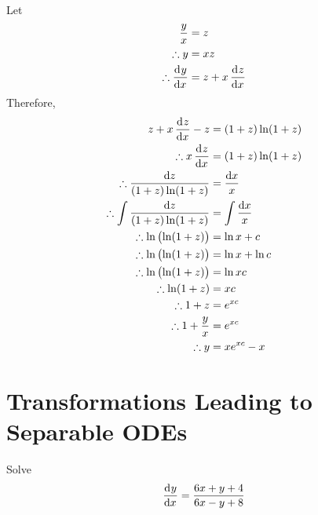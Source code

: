 \documentclass[fleqn, a4paper, 12pt, oneside]{amsart}
\theoremstyle{definition}
\theoremstyle{theorem}
\begin{document}
\begin{solution}
\begin{enumerate}[leftmargin=*]
\begin{align*}
			\end{align*}
			Let
			\begin{align*}
				\dfrac{y}{x} &= z\\
				\therefore y &= x z\\
				\therefore \dod{y}{x} &= z + x \dod{z}{x}
			\end{align*}
			Therefore,
			\begin{align*}
				z + x \dod{z}{x} - z &= (1 + z) \ln (1 + z)\\
				\therefore x \dod{z}{x} &= (1 + z) \ln (1 + z)\\
				\therefore \dfrac{\dif z}{(1 + z) \ln (1 + z)} &= \dfrac{\dif x}{x}\\
				\therefore \int \dfrac{\dif z}{(1 + z) \ln (1 + z)} &= \int \dfrac{\dif x}{x}\\
				\therefore \ln \left( \ln (1 + z) \right) &= \ln x + c\\
				\therefore \ln \left( \ln (1 + z) \right) &= \ln x + \ln c\\
				\therefore \ln \left( \ln (1 + z) \right) &= \ln x c\\
				\therefore \ln (1 + z) &= x c\\
				\therefore 1 + z &= e^{x c}\\
				\therefore 1 + \dfrac{y}{x} &= e^{x c}\\
				\therefore y &= x e^{x c} - x
			\end{align*}
	\end{enumerate}
\end{solution}

\part{Transformations Leading to Separable ODEs}

\begin{question}
	Solve
	\begin{equation*}
		\dod{y}{x} = \dfrac{6x + y + 4}{6x - y + 8}
	\end{equation*}
\end{question}
\end{document}
